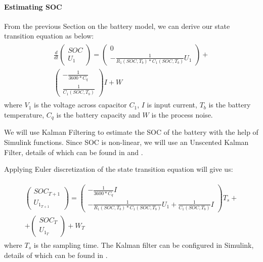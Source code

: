 \paragraph{Estimating SOC} From the previous Section  on the battery model, we can derive our state transition equation as below:
\begin{equation*}
  \label{state transition_1}
\begin{aligned}
\begin{split}
  \frac{d}{dt}  \left( \begin{array}{c} SOC \\ U_1 \end{array}\right) = \left( \begin{array}{c} 0 \\ - \frac{1}{R_1(SOC, T_b)*C_1(SOC, T_b)}U_1 \end{array}\right) + \\ \left( \begin{array}{c} -\frac{1}{3600*C_q} \\  \frac{1}{C_1(SOC, T_b)} \end{array}\right)I + W
 \end{split}
 \end{aligned}
\end{equation*}
where  $V_1$ is the voltage across capacitor $C_1$, $I$ is input current, $T_b$ is the battery temperature, $C_q$ is the battery capacity and $W$ is the process noise.

We will use Kalman Filtering to estimate the SOC of the battery with the help of Simulink functions. Since SOC is non-linear, we will use an Unscented Kalman Filter, details of which can be found in \cite{6183271} and \cite{882463}.

Applying Euler discretization of the state transition equation will give us:

\begin{equation*}
  \label{state transition_2}
\begin{aligned}
\begin{split}
 \left( \begin{array}{c} SOC_{T+1} \\ U_{1_{T+1}}\end{array}\right) = 
 \left( \begin{array}{c} -\frac{1}{3600*C_q}I \\-\frac{1}{R_1(SOC, T_b)*C_1(SOC, T_b)}U_1 + \frac{1}{C_1(SOC, T_b)}I\end{array}\right)T_s + \\
 + \left( \begin{array}{c} SOC_{T} \\ U_{1_{T}}\end{array}\right) + W_T
 \end{split}
 \end{aligned}
\end{equation*}
where $T_s$ is the sampling time.
The Kalman filter can be configured in Simulink, details of which can be found in \cite{6183271}.

